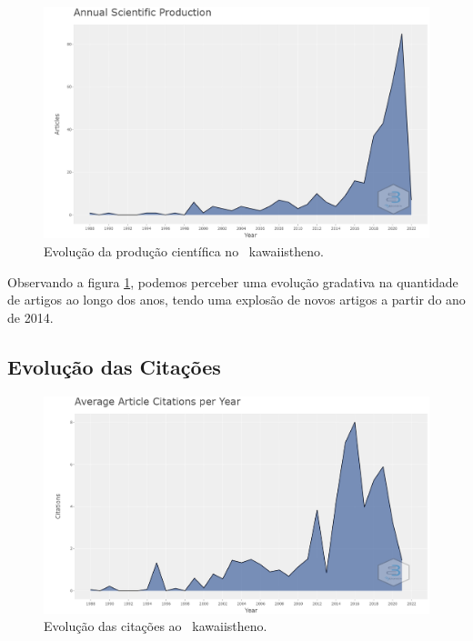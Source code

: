 \begin{figure}
    \centering
    \includegraphics[width=1\textwidth]{experiments/KawaiiStheno/PesqBibliogr/NeurocienciaIIA/WoS-20220206/scientificProdution.png}
    \caption{Evolução da produção científica no \dataset\   kawaiistheno.}
    \label{fig:evol:anual:kawaiistheno}
\end{figure}

Observando a figura \ref{fig:evol:anual:kawaiistheno}, podemos perceber uma evolução gradativa na quantidade de artigos ao longo dos anos, tendo uma explosão de novos artigos a partir do ano de 2014.

\subsection{Evolução das Citações}

\begin{figure}
    \centering
    \includegraphics[width=1\textwidth]{experiments/KawaiiStheno/PesqBibliogr/NeurocienciaIIA/WoS-20220206/citationsYear.png}
    \caption{Evolução das citações ao \dataset\   kawaiistheno.}
    \label{fig:cit:anual:kawaiistheno}
\end{figure}


